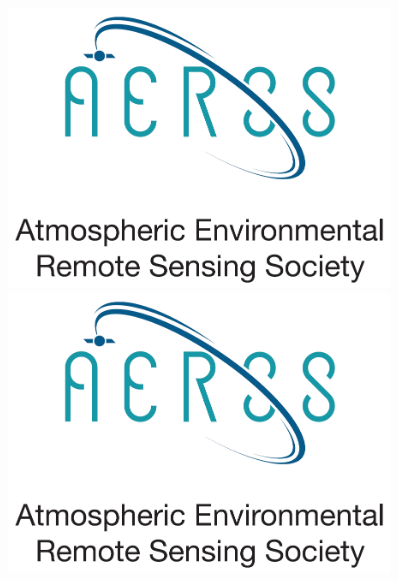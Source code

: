 \documentclass[final]{beamer}
\newlength{\sepwidth}
\newlength{\colwidth}
\newcommand{\separatorcolumn}{\begin{column}{\sepwidth}\end{column}}
\begin{document}
\begin{frame}[t]
\begin{columns}[t]
\begin{column}{\colwidth}
\begin{block}{}
\begin{figure}
\begin{minipage}[t]{0.2\colwidth}
                       \includegraphics[scale=0.2]{logos/aerss_logo.png}
                   \end{minipage}
                   \begin{minipage}[t]{0.2\colwidth}
                       \includegraphics[scale=0.2]{logos/aerss_logo.png}
                   \end{minipage}
                \end{figure}

			\end{block}
		\end{column}
	
		\separatorcolumn
		
		\begin{column}{\colwidth}
			

\end{column}
\end{columns}
\end{frame}
\end{document}
